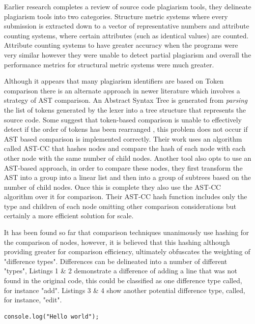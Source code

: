 \documentclass[jou,apacite]{apa6}
\begin{document}
Earlier research \cite{Lancaster2005} completes a review of  source code plagiarism tools, they delineate plagiarism tools into two categories. Structure metric systems where every submission is extracted down to a vector of representative numbers and attribute counting systems, where certain attributes (such as identical values) are counted. Attribute counting systems to have greater accuracy when the programs were very similar however they were unable to detect partial plagiarism and overall the performance metrics for structural metric systems were much greater. 

Although it appears that many plagiarism identifiers are based on Token comparison there is an alternate approach in newer literature which involves a strategy of AST comparison.  An Abstract Syntax Tree is generated from \textit{parsing} the list of tokens generated by the lexer into a tree structure that represents the source code. Some suggest that token-based comparison is unable to effectively detect if the order of tokens has been rearranged \cite{Feng2013}, this problem does not occur if AST based comparison is implemented correctly. Their work uses an algorithm called AST-CC that hashes nodes and compare the hash of each node with each other node with the same number of child nodes. Another tool \cite{Zhao2015} also opts to use an AST-based approach, in order to compare these nodes, they first transform the AST into a group into a linear list and then into a group of subtrees based on the number of child nodes. Once this is complete they also use the AST-CC algorithm over it for comparison. Their AST-CC hash function includes only the type and children of each node omitting other comparison considerations but certainly a more efficient solution for scale.

It has been found so far that comparison techniques unanimously use hashing for the comparison of nodes, however, it is believed that this hashing although providing greater for comparison efficiency, ultimately obfuscates the weighting of "difference types". Differences can be delineated into a number of different "types", Listings 1 \& 2 demonstrate a difference of adding a line that was not found in the original code, this could be classified as one difference type called, for instance "add".  Listings 3 \& 4 show another potential difference type, called, for instance, "edit".

\begin{lstlisting}[caption=Difference type add - A]
console.log("Hello world");
\end{lstlisting}
\end{document}
